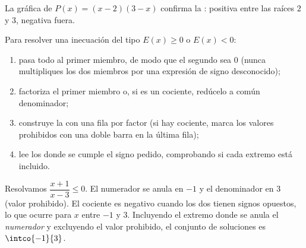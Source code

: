 \begin{omfigure}

{\small La gráfica de $P(x) = (x-2)(3-x)$ confirma la :
positiva entre las raíces $2$ y $3$, negativa fuera.}
\end{omfigure}

\begin{method}\label{met:g10:algebra:signtable}
Para resolver una inecuación del tipo $E(x) \geq 0$ o $E(x) < 0$:
\begin{enumerate}
  \item pasa todo al primer miembro, de modo que el segundo sea $0$ (nunca
        multipliques los dos miembros por una expresión de signo
        desconocido);
  \item factoriza el primer miembro o, si es un cociente, redúcelo a común
        denominador;
  \item construye la  con una fila por factor (si hay
        cociente, marca los valores prohibidos con una doble barra en la
        última fila);
  \item lee los  donde se cumple el signo pedido, comprobando si
        cada extremo está incluido.
\end{enumerate}
\end{method}

\begin{example}\label{ex:g10:algebra:quotientineq}
Resolvamos $\dfrac{x + 1}{x - 3} \leq 0$. El numerador se anula en $-1$ y
el denominador en $3$ (valor prohibido). El cociente es negativo cuando
los dos tienen signos opuestos, lo que ocurre para $x$ entre $-1$ y $3$.
Incluyendo el extremo donde se anula el \emph{numerador} y excluyendo el
valor prohibido, el conjunto de soluciones es $\intco{-1}{3}$.
\end{example}

